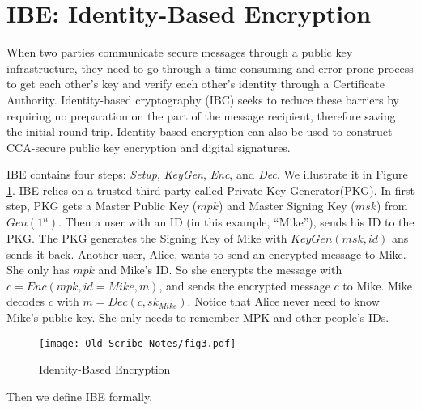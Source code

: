\section{IBE: Identity-Based Encryption}
When two parties communicate secure messages through a public key infrastructure, they need to go through a time-consuming and error-prone process to get each other's key and verify each other's identity through a Certificate Authority. 
Identity-based cryptography (IBC) seeks to reduce these barriers by requiring no preparation on the part of the message recipient, therefore saving the initial round trip. 
Identity based encryption can also be used to construct CCA-secure public key encryption and digital signatures. 

IBE contains four steps: \emph{Setup}, \emph{KeyGen}, \emph{Enc}, and \emph{Dec}. We illustrate it in Figure \ref{fig:ibe}.
IBE relies on a trusted third party called Private Key Generator(PKG). 
In first step, PKG gets a Master Public Key ($mpk$) and Master Signing Key ($msk$) from $Gen(1^n)$. 
Then a user with an ID (in this example, ``Mike''), sends his ID to the PKG. 
The PKG generates the Signing Key of Mike with $KeyGen(msk, id)$ ans sends it back. 
Another user, Alice, wants to send an encrypted message to Mike. 
She only has $mpk$ and Mike's ID. 
So she encrypts the message with $c=Enc(mpk, id=Mike, m)$, and sends the encrypted message $c$ to Mike. 
Mike decodes $c$ with $m=Dec(c, sk_{Mike})$. 
Notice that Alice never need to know Mike's public key. 
She only needs to remember MPK and other people's IDs.

\begin{figure}
\label{fig:ibe}
\centering
  \texttt{[image: Old Scribe Notes/fig3.pdf]}
\caption{Identity-Based Encryption}
\end{figure}

Then we define IBE formally, 

